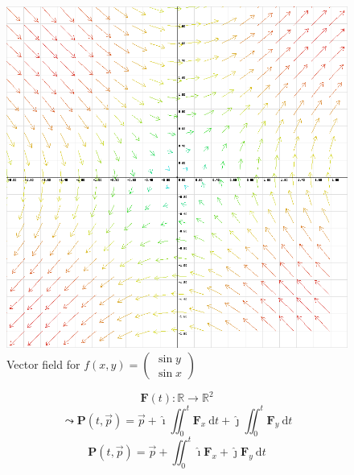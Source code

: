\documentclass[a4paper, 12pt]{article} %
\newcommand{\fatf}{\mathbf{F}} %
\begin{document}
\newpage
\begin{figure}
	\includegraphics[scale=0.45]{out.png}
	\centering
	\caption{Vector field for $f(x,y)=\begin{pmatrix}\sin y\\\sin x\end{pmatrix}$}
	\label{fig:Banana}
\end{figure}
$$\fatf(t):\mathbb{R}\rightarrow\mathbb{R}^2$$
$$\leadsto\mathbf{P}(t, \vec{p})=\vec{p}+\hat{\imath}\iint_0^t\fatf_x\ \mathrm{d}t+\hat{\jmath}\iint_0^t\fatf_y\ \mathrm{d}t$$
$$\mathbf{P}(t, \vec{p})=\vec{p}+\iint_0^t\hat{\imath}\fatf_x+\hat{\jmath}\fatf_y\ \mathrm{d}t$$
\end{document}
